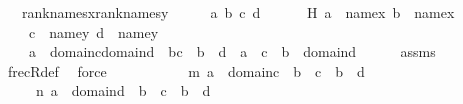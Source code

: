 \begin{isabellebody}
\ \ \ {\isachardoublequoteopen}rank{\isacharunderscore}{\kern0pt}names{\isacharparenleft}{\kern0pt}x{\isacharparenright}{\kern0pt}{\isasymle}rank{\isacharunderscore}{\kern0pt}names{\isacharparenleft}{\kern0pt}y{\isacharparenright}{\kern0pt}{\isachardoublequoteclose}\isanewline
%
\isadelimproof
%
\endisadelimproof
%
\isatagproof
{}\isamarkupfalse%
\ {\isacharminus}{\kern0pt}\isanewline
\ \ \isamarkupfalse%
\ a\ b\ c\ d\ \ \isanewline
\ \ \ \ H{\isacharcolon}{\kern0pt}\ {\isachardoublequoteopen}a\ {\isacharequal}{\kern0pt}\ name{}{\isacharparenleft}{\kern0pt}x{\isacharparenright}{\kern0pt}{\isachardoublequoteclose}\ {\isachardoublequoteopen}b\ {\isacharequal}{\kern0pt}\ name{}{\isacharparenleft}{\kern0pt}x{\isacharparenright}{\kern0pt}{\isachardoublequoteclose}\isanewline
\ \ \ \ {\isachardoublequoteopen}c\ {\isacharequal}{\kern0pt}\ name{}{\isacharparenleft}{\kern0pt}y{\isacharparenright}{\kern0pt}{\isachardoublequoteclose}\ {\isachardoublequoteopen}d\ {\isacharequal}{\kern0pt}\ name{}{\isacharparenleft}{\kern0pt}y{\isacharparenright}{\kern0pt}{\isachardoublequoteclose}\isanewline
\ \ \ \ {\isachardoublequoteopen}{\isacharparenleft}{\kern0pt}a\ {\isasymin}\ domain{\isacharparenleft}{\kern0pt}c{\isacharparenright}{\kern0pt}{\isasymunion}domain{\isacharparenleft}{\kern0pt}d{\isacharparenright}{\kern0pt}\ {\isasymand}\ {\isacharparenleft}{\kern0pt}b{\isacharequal}{\kern0pt}c\ {\isasymor}\ b\ {\isacharequal}{\kern0pt}\ d{\isacharparenright}{\kern0pt}{\isacharparenright}{\kern0pt}\ {\isasymor}\ {\isacharparenleft}{\kern0pt}a\ {\isacharequal}{\kern0pt}\ c\ {\isasymand}\ b\ {\isasymin}\ domain{\isacharparenleft}{\kern0pt}d{\isacharparenright}{\kern0pt}{\isacharparenright}{\kern0pt}{\isachardoublequoteclose}\isanewline
\ \ \ \ \isamarkupfalse%
\ assms\ \isamarkupfalse%
\ frecR{\isacharunderscore}{\kern0pt}def\ \isamarkupfalse%
\ force\isanewline
\ \ \isamarkupfalse%
\ \isanewline
\ \ \isamarkupfalse%
\isanewline
\ \ \ \ {\isacharparenleft}{\kern0pt}m{\isacharparenright}{\kern0pt}\ {\isachardoublequoteopen}a\ {\isasymin}\ domain{\isacharparenleft}{\kern0pt}c{\isacharparenright}{\kern0pt}\ {\isasymand}\ {\isacharparenleft}{\kern0pt}b\ {\isacharequal}{\kern0pt}\ c\ {\isasymor}\ b\ {\isacharequal}{\kern0pt}\ d{\isacharparenright}{\kern0pt}\ {\isachardoublequoteclose}\isanewline
\ \ \ \ {\isacharbar}{\kern0pt}\ {\isacharparenleft}{\kern0pt}n{\isacharparenright}{\kern0pt}\ {\isachardoublequoteopen}a\ {\isasymin}\ domain{\isacharparenleft}{\kern0pt}d{\isacharparenright}{\kern0pt}\ {\isasymand}\ {\isacharparenleft}{\kern0pt}b\ {\isacharequal}{\kern0pt}\ c\ {\isasymor}\ b\ {\isacharequal}{\kern0pt}\ d{\isacharparenright}{\kern0pt}{\isachardoublequoteclose}\ \isanewline

\end{isabellebody}
